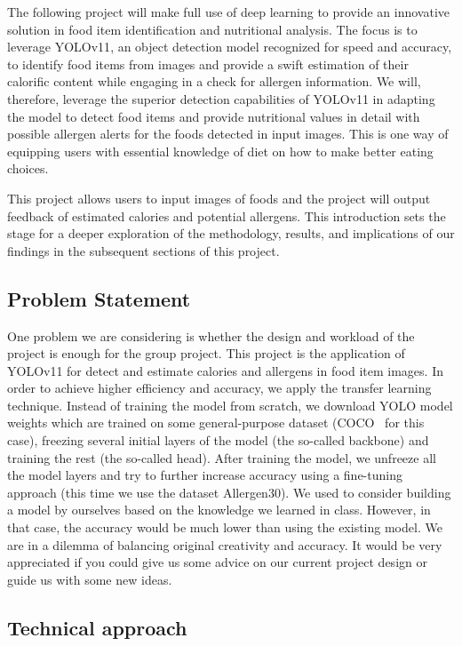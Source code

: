 \documentclass[10pt,twocolumn,letterpaper]{article}
\begin{document}
The following project will make full use of deep learning to provide an innovative solution in food item identification and nutritional analysis. The focus is to leverage YOLOv11\cite{redmon2016lookonceunifiedrealtime}, an object detection model recognized for speed and accuracy, to identify food items from images and provide a swift estimation of their calorific content while engaging in a check for allergen information. We will, therefore, leverage the superior detection capabilities of YOLOv11 in adapting the model to detect food items and provide nutritional values in detail with possible allergen alerts for the foods detected in input images. This is one way of equipping users with essential knowledge of diet on how to make better eating choices.

This project allows users to input images of foods and the project will output feedback of estimated calories and potential allergens.
This introduction sets the stage for a deeper exploration of the methodology, results, and implications of our findings in the subsequent sections of this project.

\subsection{Problem Statement}

One problem we are considering is whether the design and workload of the project is enough for the group project.
This project is the application of YOLOv11 for detect and estimate calories and allergens in food item images.
In order to achieve higher efficiency and accuracy, we apply the transfer learning technique.
Instead of training the model from scratch, we download YOLO model weights which are trained on some general-purpose dataset (COCO~\cite{lin2015microsoftcococommonobjects} for this case), freezing several initial layers of the model (the so-called backbone) and training the rest (the so-called head).
After training the model, we unfreeze all the model layers and try to further increase accuracy using a fine-tuning approach (this time we use the dataset Allergen30).
We used to consider building a model by ourselves based on the knowledge we learned in class.
However, in that case, the accuracy would be much lower than using the existing model.
We are in a dilemma of balancing original creativity and accuracy.
It would be very appreciated if you could give us some advice on our current project design or guide us with some new ideas. 

\subsection{Technical approach}
\end{document}
